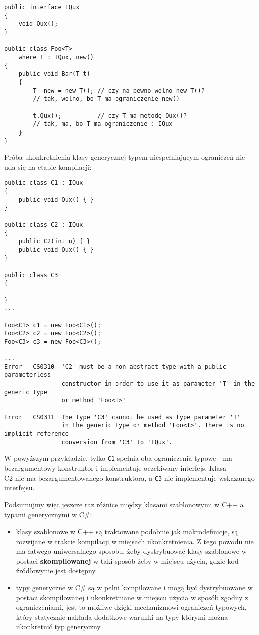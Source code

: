 \begin{scriptsize}
\begin{verbatim}
public interface IQux
{
    void Qux();
}

public class Foo<T>
    where T : IQux, new()
{
    public void Bar(T t)
    {
        T _new = new T(); // czy na pewno wolno new T()?
        // tak, wolno, bo T ma ograniczenie new()

        t.Qux();          // czy T ma metodę Qux()?
        // tak, ma, bo T ma ograniczenie : IQux
    }
}
\end{verbatim}
\end{scriptsize}

Próba ukonkretnienia klasy generycznej typem niespełniającym ograniczeń nie uda się na etapie kompilacji:

\begin{scriptsize}
\begin{verbatim}
public class C1 : IQux
{
    public void Qux() { }
}

public class C2 : IQux
{
    public C2(int n) { }
    public void Qux() { }
}

public class C3
{
    
}
...

Foo<C1> c1 = new Foo<C1>();
Foo<C2> c2 = new Foo<C2>();
Foo<C3> c3 = new Foo<C3>();

...
Error	CS0310	'C2' must be a non-abstract type with a public parameterless 
                constructor in order to use it as parameter 'T' in the generic type 
                or method 'Foo<T>'	

Error	CS0311	The type 'C3' cannot be used as type parameter 'T' 
                in the generic type or method 'Foo<T>'. There is no implicit reference 
                conversion from 'C3' to 'IQux'.	
\end{verbatim}
\end{scriptsize}

W powyższym przykładzie, tylko {\tt C1} spełnia oba ograniczenia typowe - ma bezargumentowy konstruktor i
implementuje oczekiwany interfejs. Klasa {\\ C2} nie ma bezargumentowanego konstruktora, a {\tt C3} nie
implementuje wskazanego interfejsu. 

Podsumujmy więc jeszcze raz różnice między klasami szablonowymi w C++ a typami generycznymi w C\#:
\begin{itemize}
\item klasy szablonowe w C++ są traktowane podobnie jak makrodefinicje, są rozwijane w trakcie kompilacji w miejsach
ukonkretnienia. Z tego powodu nie ma łatwego uniwersalnego sposobu, 
żeby dystrybuować klasy szablonowe w postaci {\bf skompilowanej} w taki sposób żeby w miejscu użycia, gdzie
kod źródłowynie jest dostępny
\item typy generyczne w C\# są w pełni kompilowane i mogą być dystrybuowane w postaci skompilowanej i ukonkretniane
w miejscu użycia w sposób zgodny z ograniczeniami, jest to możliwe dzięki mechanizmowi ograniczeń typowych, który
statycznie nakłada dodatkowe warunki na typy którymi można ukonkretnić typ generyczny
\end{itemize}